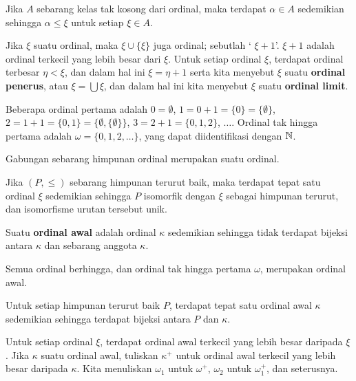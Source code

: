  Jika $A$ sebarang kelas tak kosong dari ordinal,
maka terdapat $\alpha\in A$ sedemikian sehingga $\alpha\le\xi$ untuk setiap
$\xi\in A$. 

 Jika $\xi$ suatu ordinal, maka $\xi\cup\{\xi\}$
juga ordinal; sebutlah ` $\xi+1$'.  $\xi+1$ adalah ordinal terkecil yang lebih besar dari
$\xi$.  Untuk setiap ordinal $\xi$, terdapat ordinal terbesar
$\eta<\xi$, dan dalam hal ini $\xi=\eta+1$ serta kita menyebut $\xi$ suatu
{\bf ordinal penerus}, atau $\xi=\bigcup\xi$, dan dalam hal ini kita menyebut
$\xi$ suatu {\bf ordinal limit}.

 Beberapa ordinal pertama adalah $0=\emptyset$,
$1=0+1=\{0\}=\{\emptyset\}$,
$2=1+1=\{0,1\}=\{\emptyset,\{\emptyset\}\}$,
$3=2+1=\{0,1,2\}$, $\ldots$. Ordinal tak hingga pertama adalah
$\omega=\{0,1,2,\ldots\}$, yang dapat diidentifikasi dengan $\Bbb N$.

 Gabungan sebarang himpunan ordinal merupakan suatu
ordinal. 

 Jika $(P,\le)$ sebarang himpunan terurut baik, maka
terdapat tepat satu ordinal $\xi$ sedemikian sehingga $P$ isomorfik dengan
$\xi$ sebagai himpunan terurut, dan isomorfisme urutan tersebut unik.

 Suatu {\bf ordinal awal} adalah ordinal $\kappa$
sedemikian sehingga tidak terdapat bijeksi antara $\kappa$ dan sebarang
anggota $\kappa$. 

 Semua ordinal
berhingga, dan ordinal tak hingga pertama $\omega$, merupakan ordinal awal.

 Untuk setiap himpunan terurut baik $P$, terdapat
tepat satu ordinal awal $\kappa$ sedemikian sehingga terdapat bijeksi antara
$P$ dan $\kappa$.

 Untuk setiap ordinal $\xi$, terdapat ordinal awal
terkecil yang lebih besar daripada $\xi$.  Jika $\kappa$ suatu ordinal awal, tuliskan $\kappa^+$ untuk
ordinal awal terkecil yang lebih besar daripada $\kappa$. Kita menuliskan
$\omega_1$ untuk $\omega^+$, $\omega_2$ untuk $\omega_1^+$, dan seterusnya.

